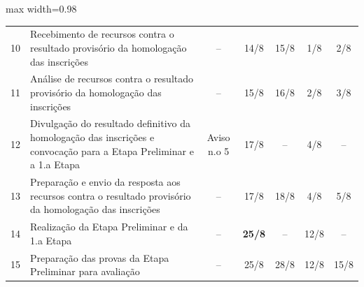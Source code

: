 \begin{landscape}
\begin{quadro}[htb]
\begin{adjustbox}{max width=0.98\linewidth}
\begin{tabular}{|c|l|c|c|c|c|c|}
10 & Recebimento de   recursos contra o resultado provisório da homologação das inscrições                                                      & –                   & 14/8                                                                            & 15/8                                  & 1/8                                                                             & 2/8                  \\
\rowcolor[HTML]{FCD5B4} 
11 & Análise de recursos   contra o resultado provisório da homologação das inscrições                                                          & –                   & 15/8                                                                            & 16/8                                  & 2/8                                                                             & 3/8                  \\
\rowcolor[HTML]{92CDDC} 
12 & Divulgação do   resultado definitivo da homologação das inscrições e convocação para a Etapa   Preliminar e a 1.a Etapa                    & Aviso n.o 5         & 17/8                                                                            & –                                     & 4/8                                                                             & –                    \\
13 & Preparação e envio da   resposta aos recursos contra o resultado provisório da homologação das   inscrições                                & –                   & 17/8                                                                            & 18/8                                  & 4/8                                                                             & 5/8                  \\
\rowcolor[HTML]{92D050} 
14 & Realização da Etapa   Preliminar e da 1.a Etapa                                                                                            & –                   & {\color[HTML]{FF0000} \textbf{25/8}}                                            & –                                     & 12/8                                                                            & –                    \\
15 & Preparação das provas   da Etapa Preliminar para avaliação                                                                                 & –                   & 25/8                                                                            & 28/8                                  & 12/8                                                                            & 15/8                 \\

\end{tabular}
\end{adjustbox}
\end{quadro}
\end{landscape}
